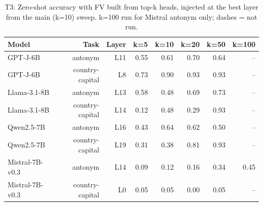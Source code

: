\begin{table}[t]
\centering
\small
\begin{tabular}{lrrrrrrr}
\toprule
Model & Task & Layer & k=5 & k=10 & k=20 & k=50 & k=100 \\
\midrule
GPT-J-6B & antonym & L11 & 0.55 & 0.61 & 0.70 & 0.64 & -- \\
GPT-J-6B & country-capital & L8 & 0.73 & 0.90 & 0.93 & 0.93 & -- \\
Llama-3.1-8B & antonym & L13 & 0.58 & 0.48 & 0.69 & 0.73 & -- \\
Llama-3.1-8B & country-capital & L14 & 0.12 & 0.48 & 0.29 & 0.93 & -- \\
Qwen2.5-7B & antonym & L16 & 0.43 & 0.64 & 0.62 & 0.50 & -- \\
Qwen2.5-7B & country-capital & L19 & 0.31 & 0.38 & 0.81 & 0.93 & -- \\
Mistral-7B-v0.3 & antonym & L14 & 0.09 & 0.12 & 0.16 & 0.34 & 0.45 \\
Mistral-7B-v0.3 & country-capital & L0 & 0.05 & 0.05 & 0.00 & 0.05 & -- \\
\bottomrule
\end{tabular}
\caption{T3: Zero-shot accuracy with FV built from top-k heads, injected at the best layer from the main (k=10) sweep. k=100 run for Mistral antonym only; dashes = not run.}
\label{tab:T3_k_ablation}
\end{table}
